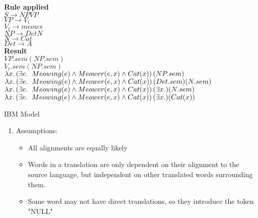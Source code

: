 \documentclass[12pt]{article}
\newcommand{\lp}{\left(}
\newcommand{\rp}{\right)}
\newenvironment{exercise}[2][Exercise]{\begin{trivlist}
\item[\hskip \labelsep {\bfseries #1}\hskip \labelsep {\bfseries #2.}]}{\end{trivlist}}
\begin{document}
\begin{exercise}{5}
\begin{enumerate}[label=(\alph*)]
\begin{vwcol}[widths={0.25,1.2}]
\textbf{Rule applied} \\
$S \rightarrow NP VP$\\
$VP \rightarrow V_i$\\  
$V_t \rightarrow meows$ \\ 
$NP \rightarrow Det N$ \\ 
$N \rightarrow  Cat$ \\ 
$Det \rightarrow A$ \\ 
\textbf{Result} \\
$VP.sem(NP.sem)$ \\
$V_t.sem(NP.sem)$ \\
$\lambda x. \lp \exists e. \hspace{0.2cm} Meowing(e) \land Meower(e,x) \land Cat(x)\rp (NP.sem)$ \\
$\lambda x. \lp \exists e. \hspace{0.2cm} Meowing(e) \land Meower(e,x) \land Cat(x)\rp (Det.sem)(N.sem)$ \\
$\lambda x. \lp \exists e. \hspace{0.2cm} Meowing(e) \land Meower(e,x) \land Cat(x)\rp (\exists x.)(N.sem)$ \\
$\lambda x. \lp \exists e. \hspace{0.2cm} Meowing(e) \land Meower(e,x) \land Cat(x)\rp (\exists x.)(Cat(x))$ \\
\end{vwcol}

\end{enumerate}
\end{exercise} 

\begin{exercise}{6} IBM Model
\begin{enumerate}[label=(\alph*)]

 \item Assumptions:
 
 \begin{itemize}
 \item All alignments are equally likely
 \item Words in a translation are only dependent on their alignment to the source language, but independent on other translated words surrounding them.
 \item Some word may not have direct translations, so they introduce the token "NULL"
 \end{itemize}
 
\end{enumerate}
\end{exercise}
 

 
 
 
\end{document}
